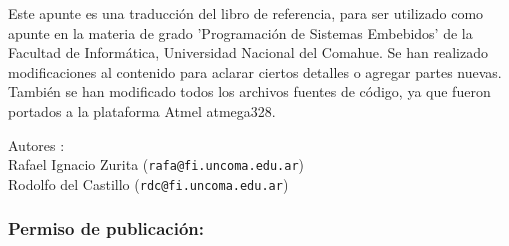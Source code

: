 \documentclass[12pt]{article}
\begin{document}
Este apunte es una traducción del libro de referencia, para
ser utilizado como apunte en la materia de grado
'Programación de Sistemas Embebidos' de la Facultad de Informática,
Universidad Nacional del Comahue.
Se han realizado modificaciones
al contenido para aclarar ciertos detalles o agregar partes nuevas.
 También se han
modificado todos los archivos fuentes de código, ya que fueron
portados a la plataforma Atmel atmega328.

Autores : \\
Rafael Ignacio Zurita ({\tt rafa@fi.uncoma.edu.ar}) \\
Rodolfo del Castillo ({\tt rdc@fi.uncoma.edu.ar})


\subsubsection *{Permiso de publicación:}
\end{document}

